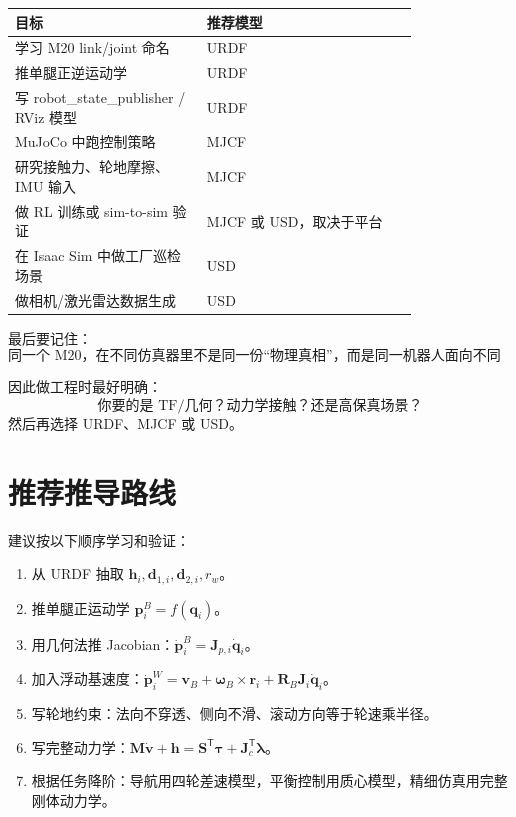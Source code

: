 \documentclass[UTF8,11pt,a4paper]{ctexart}
\newcommand{\T}{^{\mathsf T}}
\newcommand{\bs}[1]{\bm{#1}}
\begin{document}
\begin{center}
\begin{tabular}{p{0.38\linewidth}p{0.42\linewidth}}
\toprule
目标 & 推荐模型 \\
\midrule
学习 M20 link/joint 命名 & URDF\\
推单腿正逆运动学 & URDF\\
写 robot\_state\_publisher / RViz 模型 & URDF\\
MuJoCo 中跑控制策略 & MJCF\\
研究接触力、轮地摩擦、IMU 输入 & MJCF\\
做 RL 训练或 sim-to-sim 验证 & MJCF 或 USD，取决于平台\\
在 Isaac Sim 中做工厂巡检场景 & USD\\
做相机/激光雷达数据生成 & USD\\
\bottomrule
\end{tabular}
\end{center}

最后要记住：
\[
\boxed{
\text{同一个 M20，在不同仿真器里不是同一份“物理真相”，而是同一机器人面向不同工具的不同建模版本。}
}
\]

因此做工程时最好明确：
\[
\text{你要的是 TF/几何？动力学接触？还是高保真场景？}
\]
然后再选择 URDF、MJCF 或 USD。

\section{推荐推导路线}

建议按以下顺序学习和验证：

\begin{enumerate}
  \item 从 URDF 抽取 \(\bs h_i,\bs d_{1,i},\bs d_{2,i},r_w\)。
  \item 推单腿正运动学 \(\bs p_i^B=f(\bs q_i)\)。
  \item 用几何法推 Jacobian：\(\dot{\bs p}_i^B=\bs J_{p,i}\dot{\bs q}_i\)。
  \item 加入浮动基速度：\(\dot{\bs p}_i^W=\bs v_B+\bs \omega_B\times \bs r_i+\bs R_B\bs J_i\dot{\bs q}_i\)。
  \item 写轮地约束：法向不穿透、侧向不滑、滚动方向等于轮速乘半径。
  \item 写完整动力学：\(\bs M\dot{\bs v}+\bs h=\bs S\T\bs \tau+\bs J_c\T\bs \lambda\)。
  \item 根据任务降阶：导航用四轮差速模型，平衡控制用质心模型，精细仿真用完整刚体动力学。
\end{enumerate}
\end{document}

